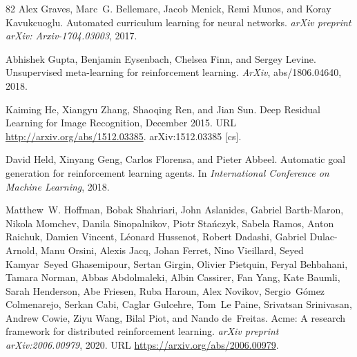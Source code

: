 \documentclass{article}
\begin{document}
\begin{thebibliography}{82}
Alex Graves, Marc~G. Bellemare, Jacob Menick, Remi Munos, and Koray Kavukcuoglu.
\newblock Automated curriculum learning for neural networks.
\newblock \emph{arXiv preprint arXiv: Arxiv-1704.03003}, 2017.

Abhishek Gupta, Benjamin Eysenbach, Chelsea Finn, and Sergey Levine.
\newblock Unsupervised meta-learning for reinforcement learning.
\newblock \emph{ArXiv}, abs/1806.04640, 2018.

Kaiming He, Xiangyu Zhang, Shaoqing Ren, and Jian Sun.
\newblock Deep {Residual} {Learning} for {Image} {Recognition}, December 2015.
\newblock URL \url{http://arxiv.org/abs/1512.03385}.
\newblock arXiv:1512.03385 [cs].

David Held, Xinyang Geng, Carlos Florensa, and Pieter Abbeel.
\newblock Automatic goal generation for reinforcement learning agents.
\newblock In \emph{International Conference on Machine Learning}, 2018.

Matthew~W. Hoffman, Bobak Shahriari, John Aslanides, Gabriel Barth-Maron, Nikola Momchev, Danila Sinopalnikov, Piotr Sta\'nczyk, Sabela Ramos, Anton Raichuk, Damien Vincent, L\'eonard Hussenot, Robert Dadashi, Gabriel Dulac-Arnold, Manu Orsini, Alexis Jacq, Johan Ferret, Nino Vieillard, Seyed Kamyar~Seyed Ghasemipour, Sertan Girgin, Olivier Pietquin, Feryal Behbahani, Tamara Norman, Abbas Abdolmaleki, Albin Cassirer, Fan Yang, Kate Baumli, Sarah Henderson, Abe Friesen, Ruba Haroun, Alex Novikov, Sergio~G\'omez Colmenarejo, Serkan Cabi, Caglar Gulcehre, Tom~Le Paine, Srivatsan Srinivasan, Andrew Cowie, Ziyu Wang, Bilal Piot, and Nando de~Freitas.
\newblock Acme: A research framework for distributed reinforcement learning.
\newblock \emph{arXiv preprint arXiv:2006.00979}, 2020.
\newblock URL \url{https://arxiv.org/abs/2006.00979}.


\end{thebibliography}
\end{document}
